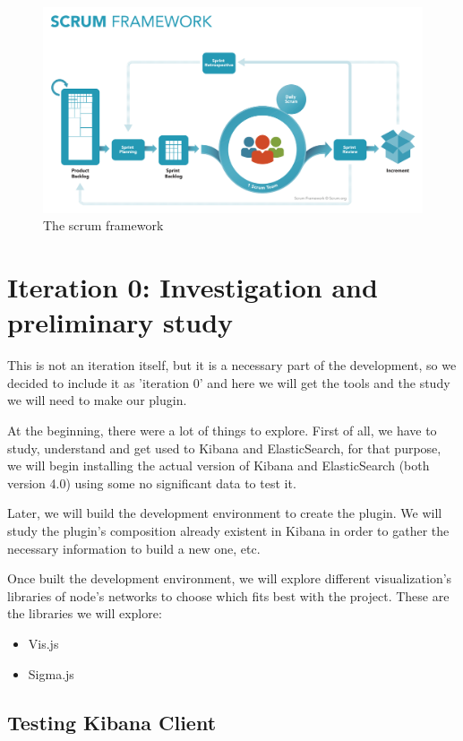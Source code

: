 \documentclass[a4paper, 12pt]{book}
\begin{document}
\begin{figure}[!htb]
  \centering
  \includegraphics[width=15cm, keepaspectratio]{img/development/SCRUM}
  \caption{The scrum framework}
  \label{fig:scrum}
\end{figure}

\section{Iteration 0: Investigation and preliminary study} 
\label{sec:it0}
This is not an iteration itself, but it is a necessary part of the development, so we decided to include it as 'iteration 0' and here we will get the tools and the study we will need to make our plugin. 

At the beginning, there were a lot of things to explore. First of all, we have to study, understand and get used to Kibana and ElasticSearch, for that purpose, we will begin installing the actual version of Kibana and ElasticSearch (both version 4.0) using some no significant data to test it.

Later, we will build the development environment to create the plugin. We will study the plugin’s composition already existent in Kibana in order to gather the necessary information to build a new one, etc.

Once built the development environment, we will explore different visualization’s libraries of node’s networks to choose which fits best with the project. These are the libraries we will explore:

\begin{itemize}
\item Vis.js
\item Sigma.js
\end{itemize}

\subsection{Testing Kibana Client}
\end{document}
